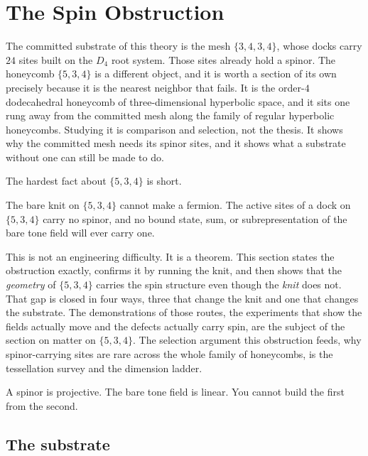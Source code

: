 \section{The Spin Obstruction}

The committed substrate of this theory is the mesh $\{3,4,3,4\}$, whose docks carry $24$ sites built on the
$D_4$ root system. Those sites already hold a spinor. The honeycomb $\{5,3,4\}$ is a different object, and it is
worth a section of its own precisely because it is the nearest neighbor that fails. It is the order-$4$
dodecahedral honeycomb of three-dimensional hyperbolic space, and it sits one rung away from the committed mesh
along the family of regular hyperbolic honeycombs. Studying it is comparison and selection, not the thesis. It
shows why the committed mesh needs its spinor sites, and it shows what a substrate without one can still be
made to do.

The hardest fact about $\{5,3,4\}$ is short.

\begin{result}
The bare knit on $\{5,3,4\}$ cannot make a fermion. The active sites of a dock on $\{5,3,4\}$ carry no spinor,
and no bound state, sum, or subrepresentation of the bare tone field will ever carry one.
\end{result}

This is not an engineering difficulty. It is a theorem. This section states the obstruction exactly, confirms
it by running the knit, and then shows that the \emph{geometry} of $\{5,3,4\}$ carries the spin structure even
though the \emph{knit} does not. That gap is closed in four ways, three that change the knit and one that
changes the substrate. The demonstrations of those routes, the experiments that show the fields actually move
and the defects actually carry spin, are the subject of the section on matter on $\{5,3,4\}$. The selection
argument this obstruction feeds, why spinor-carrying sites are rare across the whole family of honeycombs, is
the tessellation survey and the dimension ladder.

\begin{principle}
A spinor is projective. The bare tone field is linear. You cannot build the first from the second.
\end{principle}

\subsection{The substrate}

